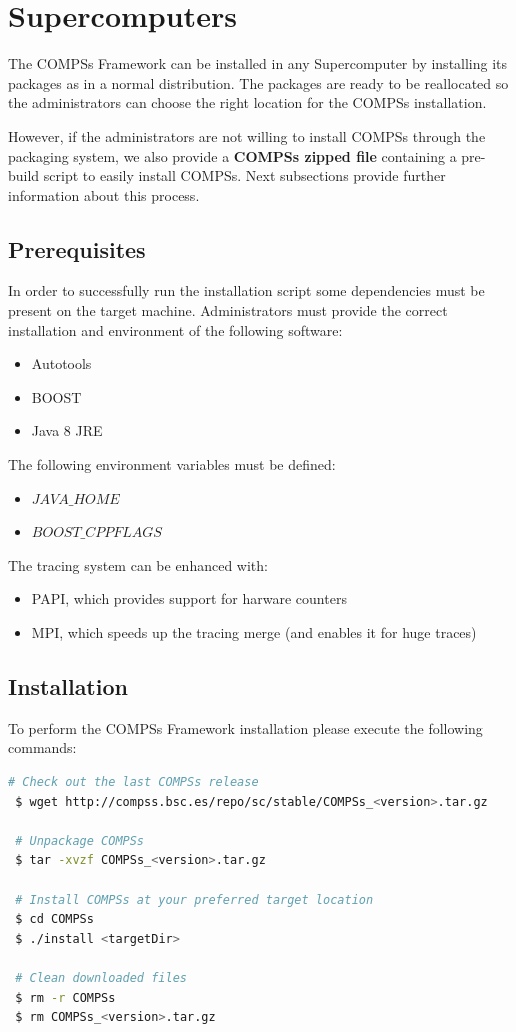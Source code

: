 \section{Supercomputers}
\label{sec:Supercomputers}

The COMPSs Framework can be installed in any Supercomputer by installing its packages as in a normal distribution. The packages are
ready to be reallocated so the administrators can choose the right location for the COMPSs installation. \newline

However, if the administrators are not willing to install COMPSs through the packaging system, we also provide a \textbf{COMPSs 
zipped file} containing a pre-build script to easily install COMPSs. Next subsections provide further information about this process.


\subsection{Prerequisites}
In order to successfully run the installation script some dependencies must be present on the target machine. Administrators must 
provide the correct installation and environment of the following software:
\begin{itemize}
 \item Autotools
 \item BOOST
 \item Java 8 JRE
\end{itemize}

The following environment variables must be defined:
\begin{itemize}
 \item $JAVA\_HOME$
 \item $BOOST\_CPPFLAGS$
\end{itemize}

The tracing system can be enhanced with:
\begin{itemize}
 \item PAPI, which provides support for harware counters
 \item MPI, which speeds up the tracing merge (and enables it for huge traces)
\end{itemize}


\subsection{Installation}
To perform the COMPSs Framework installation please execute the following commands:
\begin{lstlisting}[language=bash]
 # Check out the last COMPSs release
 $ wget http://compss.bsc.es/repo/sc/stable/COMPSs_<version>.tar.gz

 # Unpackage COMPSs
 $ tar -xvzf COMPSs_<version>.tar.gz
 
 # Install COMPSs at your preferred target location
 $ cd COMPSs
 $ ./install <targetDir>
 
 # Clean downloaded files
 $ rm -r COMPSs
 $ rm COMPSs_<version>.tar.gz
\end{lstlisting}

